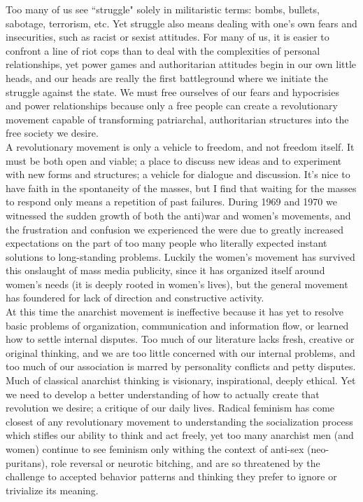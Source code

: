 Too many of us see ``struggle" solely in militaristic terms: bombs, bullets, sabotage, terrorism, etc. Yet struggle also means dealing with one's own fears and insecurities, such as racist or sexist attitudes. For many of us, it is easier to confront a line of riot cops than to deal with the complexities of personal relationships, yet power games and authoritarian attitudes begin in our own little heads, and our heads are really the first battleground where we initiate the struggle against the state. We must free ourselves of our fears and hypocrisies and power relationships because only a free people can create a revolutionary movement capable of transforming patriarchal, authoritarian structures into the free society we desire.\\
A revolutionary movement is only a vehicle to freedom, and not freedom itself. It must be both open and viable; a place to discuss new ideas and to experiment with new forms and structures; a vehicle for dialogue and discussion. It's nice to have faith in the spontaneity of the masses, but I find that waiting for the masses to respond only means a repetition of past failures. During 1969 and 1970 we witnessed the sudden growth of both the anti)war and women's movements, and the frustration and confusion we experienced the were due to greatly increased expectations on the part of too many people who literally expected instant solutions to long-standing problems. Luckily the women's movement has survived this onslaught of mass media publicity, since it has organized itself around women's needs (it is deeply rooted in women's lives), but the general movement has foundered for lack of direction and constructive activity.\\
At this time the anarchist movement is ineffective because it has yet to resolve basic problems of organization, communication and information flow, or learned how to settle internal disputes. Too much of our literature lacks fresh, creative or original thinking, and we are too little concerned with our internal problems, and too much of our association is marred by personality conflicts and petty disputes.\\
Much of classical anarchist thinking is visionary, inspirational, deeply ethical. Yet we need to develop a better understanding of how to actually create that revolution we desire; a critique of our daily lives. Radical feminism has come closest of any revolutionary movement to understanding the socialization process which stifles our ability to think and act freely, yet too many anarchist men (and women) continue to see feminism only withing the context of anti-sex (neo-puritans), role reversal or neurotic bitching, and are so threatened by the challenge to accepted behavior patterns and thinking they prefer to ignore or trivialize its meaning.\\
